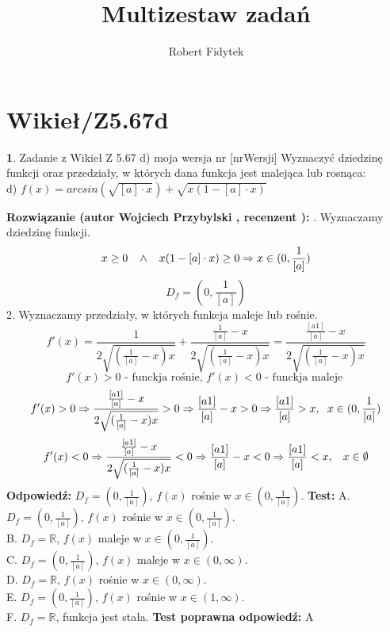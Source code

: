 \documentclass[12pt, a4paper]{article}
\title{Multizestaw zadań}
\author{Robert Fidytek}
\date{}
\theoremstyle{definition} %
\newtheorem{zad}{}
\newcommand{\kategoria}[1]{\section{#1}} %
\newcommand{\zadStart}[1]{\begin{zad}#1\newline} %
\newcommand{\zadStop}{\end{zad}}   %
\newcommand{\rozwStart}[2]{\noindent \textbf{Rozwiązanie (autor #1 , recenzent #2): }\newline} %
\newcommand{\rozwStop}{\newline}                                            %
\newcommand{\odpStart}{\noindent \textbf{Odpowiedź:}\newline}    %
\newcommand{\odpStop}{\newline}                                             %
\newcommand{\testStart}{\noindent \textbf{Test:}\newline} %
\newcommand{\testStop}{\newline} %
\newcommand{\kluczStart}{\noindent \textbf{Test poprawna odpowiedź:}\newline} %
\newcommand{\kluczStop}{\newline} %
\begin{document}
\maketitle


\kategoria{Wikieł/Z5.67d}
\zadStart{Zadanie z Wikieł Z 5.67 d) moja wersja nr [nrWersji]}
Wyznaczyć dziedzinę funkcji oraz przedziały, w których dana funkcja jest malejąca lub rosnąca:\\
d) $f(x)=arcsin(\sqrt{[a]\cdot x})+\sqrt{x(1-[a]\cdot x)}$
\zadStop
\rozwStart{Wojciech Przybylski}{}
1. Wyznaczamy dziedzinę funkcji.
$$x\geq0 \hspace{3mm} \wedge \hspace{3mm} x(1-[a]\cdot x)\geq0 \Rightarrow x\in(0,\frac{1}{[a]})$$
$$D_{f}=(0,\frac{1}{[a]})$$
2. Wyznaczamy przedziały, w których funkcja maleje lub rośnie. 
$$f'(x)=\frac{1}{2\sqrt{(\frac{1}{[a]}-x)x}}+\frac{\frac{1}{[a]}-x}{2\sqrt{(\frac{1}{[a]}-x)x}}=\frac{\frac{[a1]}{[a]}-x}{2\sqrt{(\frac{1}{[a]}-x)x}}$$
$$f'(x)>0 \mbox{ - funckja rośnie, } f'(x)<0 \mbox{ - funckja maleje }$$
$$f'(x)>0\Rightarrow \frac{\frac{[a1]}{[a]}-x}{2\sqrt{(\frac{1}{[a]}-x)x}}>0 \Rightarrow \frac{[a1]}{[a]}-x>0 \Rightarrow \frac{[a1]}{[a]}>x,\hspace{2mm} x\in(0,\frac{1}{[a]})$$
$$f'(x)<0\Rightarrow \frac{\frac{[a1]}{[a]}-x}{2\sqrt{(\frac{1}{[a]}-x)x}}<0  \Rightarrow \frac{[a1]}{[a]}-x<0 \Rightarrow \frac{[a1]}{[a]}<x, \hspace{3mm} x\in\emptyset$$
\rozwStop
\odpStart
$D_{f}=(0,\frac{1}{[a]})$, $f(x)$ rośnie w $x\in(0,\frac{1}{[a]})$.
\odpStop
\testStart
A. $D_{f}=(0,\frac{1}{[a]})$, $f(x)$ rośnie w $x\in(0,\frac{1}{[a]})$.\\
B. $D_{f}=\mathbb{R}$, $f(x)$ maleje w $x\in(0,\frac{1}{[a]})$.\\
C. $D_{f}=(0,\frac{1}{[a]})$, $f(x)$ maleje w $x\in(0,\infty)$.\\
D. $D_{f}=\mathbb{R}$, $f(x)$ rośnie w $x\in(0,\infty)$.\\
E. $D_{f}=(0,\frac{1}{[a]})$, $f(x)$ rośnie w $x\in(1,\infty)$.\\
F. $D_{f}=\mathbb{R}$, funkcja jest stała.
\testStop
\kluczStart
A
\kluczStop
\end{document}
